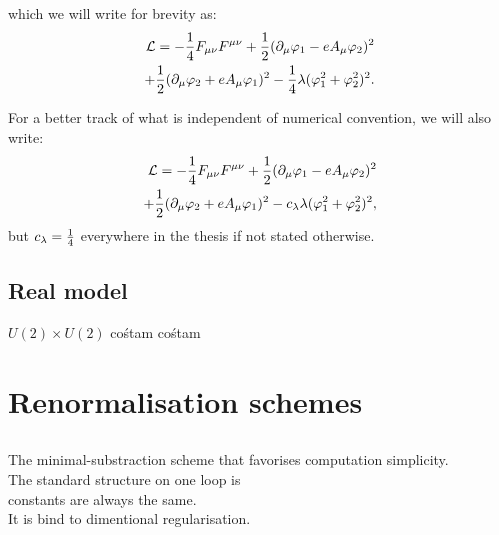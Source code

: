 which we will write for brevity as:
\begin{align}
\mathcal{L} = -\frac{1}{4}F_{\mu\nu}F^{\mu\nu}+ 
\frac{1}{2}(\partial_\mu\varphi_1 - eA_\mu\varphi_2)^2\\
+\frac{1}{2}(\partial_\mu\varphi_2+eA_\mu\varphi_1)^2
-\frac{1}{4}\lambda(\varphi_1^2+\varphi_2^2)^2. \notag
\end{align}


For a better track of what is independent of numerical convention, we will also write:
\begin{align}\label{scalar_electrodynamics}
\mathcal{L} = -\frac{1}{4}F_{\mu\nu}F^{\mu\nu}+ 
\frac{1}{2}(\partial_\mu\varphi_1 - eA_\mu\varphi_2)^2\\
+\frac{1}{2}(\partial_\mu\varphi_2+eA_\mu\varphi_1)^2
-c_\lambda\lambda(\varphi_1^2+\varphi_2^2)^2, \notag
\end{align}
but $c_\lambda = \frac{1}{4}$ everywhere in the thesis if not stated otherwise.
\subsection{Real model}
$U(2)\times U(2)$ cośtam cośtam

\section{Renormalisation schemes}
\subsection{\texorpdfstring{\MSbar}{MS-bar}}
The minimal-substraction scheme that favorises computation simplicity. \\
The standard structure on one loop is \\
constants are always the same. \\
It is bind to dimentional regularisation.
